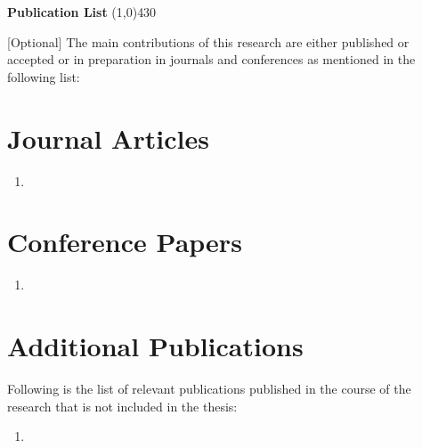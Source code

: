 \clearpage
\begin{center}
{\huge \bf Publication List}
\line(1,0){430}
\end{center}

[Optional]
The main contributions of this research are either published or accepted or in preparation in journals and conferences as mentioned in the following list:

\section*{Journal Articles}
\begin{enumerate}
\item 
\end{enumerate}

\section*{Conference Papers}
\begin{enumerate}
\item 
\end{enumerate}


\section*{Additional Publications}
Following is the list of relevant publications published in the course of the research that is not included in the thesis:
\begin{enumerate}
\item 
\end{enumerate}


  
\clearpage
